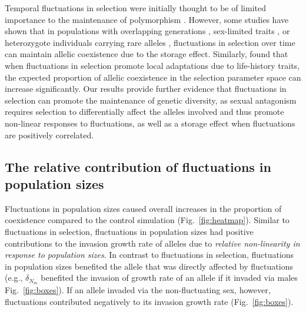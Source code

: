 Temporal fluctuations in selection were initially thought to be of limited importance to the maintenance of polymorphism  \citep{hedrick1974genetic,hedrick1986genetic}. However, some studies have shown that in populations with overlapping generations \citep{ellner1996patterns,sasaki1995evolutionarily}, sex-limited traits \citep{reinhold2000maintenance}, or heterozygote individuals carrying rare alleles \citep{schreiber2020factors}, fluctuations in selection over time can maintain allelic coexistence due to the storage effect. Similarly, \citet{connallon2018environmental} found that when fluctuations in selection promote local adaptations due to life-history traits, the expected proportion of allelic coexistence in the selection parameter space can increase significantly. Our results provide further evidence that fluctuations in selection can promote the maintenance of genetic diversity, as sexual antagonism requires selection to differentially affect the alleles involved and thus promote non-linear responses to fluctuations, as well as a storage effect when fluctuations are positively correlated.

\subsection*{The relative contribution of fluctuations in population sizes}

Fluctuations in population sizes caused overall increases in the proportion of coexistence compared to the control simulation  (Fig.~\ref{fig:heatmap}). Similar to fluctuations in selection, fluctuations in population sizes had positive contributions to the invasion growth rate of alleles due to \textit{relative non-linearity in response to population sizes}. In contrast to fluctuations in selection, fluctuations in population sizes benefited the allele that was directly affected by fluctuations (e.g., $\delta_{N_{m}}$ benefited the invasion of growth rate of an allele if it invaded via males Fig.~\ref{fig:boxes}). If an allele invaded via the non-fluctuating sex, however, fluctuations contributed negatively to its invasion growth rate (Fig.~\ref{fig:boxes}).

